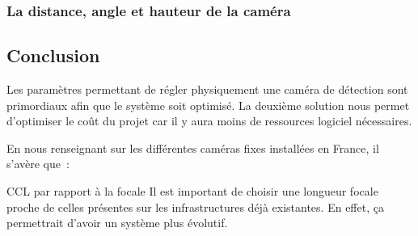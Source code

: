 \subsubsection{La distance, angle et hauteur de la caméra}
\label{sec:camera_distance}


\subsection{Conclusion}
\label{Conclusion}
Les paramètres permettant de régler physiquement une caméra de détection sont primordiaux afin que le système soit optimisé.
La deuxième solution nous permet d’optimiser le coût du projet car il y aura moins de ressources logiciel nécessaires.

En nous renseignant sur les différentes caméras fixes installées en France, il s’avère que :

CCL par rapport à la focale Il est important de choisir une longueur focale proche de celles présentes sur les infrastructures déjà existantes. En effet, ça permettrait d'avoir un système plus évolutif.
